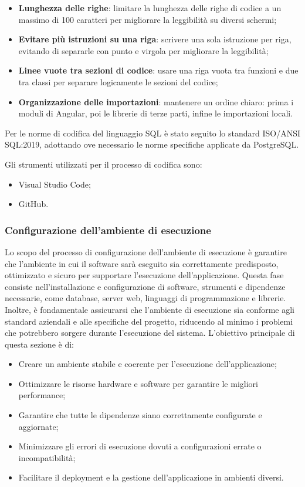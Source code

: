 \begin{itemize}
    \item \textbf{Lunghezza delle righe}: limitare la lunghezza delle righe di codice a un massimo di 100 caratteri per migliorare la leggibilità su diversi schermi;
    \item \textbf{Evitare più istruzioni su una riga}: scrivere una sola istruzione per riga, evitando di separarle con punto e virgola per migliorare la leggibilità;
    \item \textbf{Linee vuote tra sezioni di codice}: usare una riga vuota tra funzioni e due tra classi per separare logicamente le sezioni del codice;
    \item \textbf{Organizzazione delle importazioni}: mantenere un ordine chiaro: prima i moduli di Angular, poi le librerie di terze parti, infine le importazioni locali.
\end{itemize}

Per le norme di codifica del linguaggio SQL è stato seguito lo standard ISO/ANSI SQL:2019, adottando ove necessario le norme specifiche applicate da PostgreSQL.

Gli strumenti utilizzati per il processo di codifica sono:
\begin{itemize}
    \item Visual Studio Code;
    \item GitHub.
\end{itemize}

\subsubsection{Configurazione dell’ambiente di esecuzione}
Lo scopo del processo di configurazione dell'ambiente di esecuzione è garantire che l'ambiente in cui il software sarà eseguito sia correttamente predisposto, ottimizzato e sicuro per supportare l'esecuzione dell'applicazione. Questa fase consiste nell'installazione e configurazione di software, strumenti e dipendenze necessarie, come database, server web, linguaggi di programmazione e librerie. Inoltre, è fondamentale assicurarsi che l'ambiente di esecuzione sia conforme agli standard aziendali e alle specifiche del progetto, riducendo al minimo i problemi che potrebbero sorgere durante l'esecuzione del sistema. L'obiettivo principale di questa sezione è di:
\begin{itemize}
    \item Creare un ambiente stabile e coerente per l'esecuzione dell'applicazione;
    \item Ottimizzare le risorse hardware e software per garantire le migliori performance;
    \item Garantire che tutte le dipendenze siano correttamente configurate e aggiornate;
    \item Minimizzare gli errori di esecuzione dovuti a configurazioni errate o incompatibilità;
    \item Facilitare il deployment e la gestione dell'applicazione in ambienti diversi.
\end{itemize}

